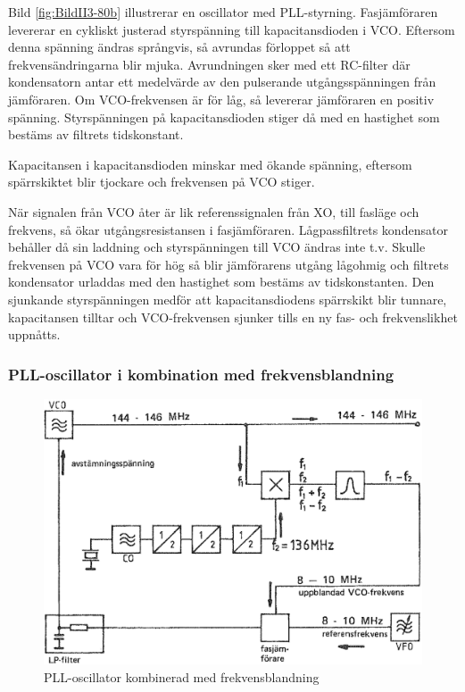 Bild \ref{fig:BildII3-80b} illustrerar en oscillator med PLL-styrning.
Fasjämföraren levererar en cykliskt justerad styrspänning till
kapacitansdioden i VCO.
Eftersom denna spänning ändras språngvis, så avrundas förloppet så att
frekvensändringarna blir mjuka.
Avrundningen sker med ett RC-filter där kondensatorn antar ett medelvärde av den
pulserande utgångsspänningen från jämföraren.
Om VCO-frekvensen är för låg, så levererar jämföraren en positiv spänning.
Styrspänningen på kapacitansdioden stiger då med en hastighet som bestäms av
filtrets tidskonstant.

Kapacitansen i kapacitansdioden minskar med ökande spänning, eftersom
spärrskiktet blir tjockare och frekvensen på VCO stiger.

När signalen från VCO åter är lik referenssignalen från XO, till
fasläge och frekvens, så ökar utgångsresistansen i fasjämföraren.
Lågpassfiltrets kondensator behåller då sin laddning
och styrspänningen till VCO ändras inte t.v.
Skulle frekvensen på VCO vara för hög så blir jämförarens utgång lågohmig och
filtrets kondensator urladdas med den hastighet som bestäms av tidskonstanten.
Den sjunkande styrspänningen medför att kapacitansdiodens spärrskikt blir
tunnare, kapacitansen tilltar och VCO-frekvensen sjunker tills en ny fas- och
frekvenslikhet uppnåtts.

\subsubsection{PLL-oscillator i kombination med frekvensblandning}

\begin{figure}
\includegraphics[width=\textwidth]{images/cropped_pdfs/bild_2_3-81.pdf}
\caption{PLL-oscillator kombinerad med frekvensblandning}
\label{fig:BildII3-81}
\end{figure}

